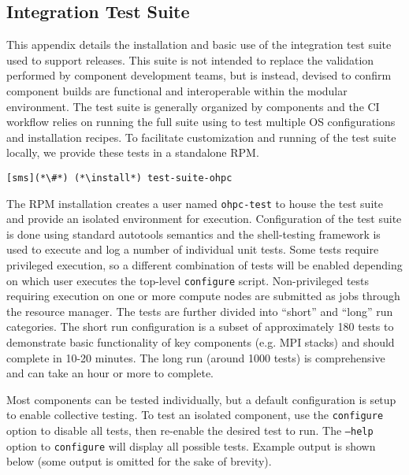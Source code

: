 \clearpage
\subsection{Integration Test Suite}  \label{appendix:test_suite}

This appendix details the installation and basic use of the integration test
suite used to support \OHPC{} releases. This suite is not intended to replace
the validation performed by component development teams, but is instead,
devised to confirm component builds are functional and interoperable within
the modular \OHPC{} environment.
The test suite is generally organized by components and the \OHPC{} CI workflow
relies on running the full suite using \href{https://jenkins.io}{\color{blue}{Jenkins}} to test
multiple OS configurations and installation recipes.
To facilitate customization and running of the test suite locally, we 
provide these tests in a standalone RPM. 

\begin{lstlisting}
[sms](*\#*) (*\install*) test-suite-ohpc
\end{lstlisting}

The RPM installation creates a user named \texttt{ohpc-test} to house the test
suite and provide an isolated environment for execution.  Configuration of the
test suite is done using standard \GNU{} autotools semantics and the
\href{https://jenkins.io}{\color{blue}{BATS}} shell-testing framework is used
to execute and log a number of individual unit tests.  Some tests require
privileged execution, so a different combination of tests will be enabled
depending on which user executes the top-level \texttt{configure}
script. Non-privileged tests requiring execution on one or more compute nodes are
submitted as jobs through the \rms{} resource manager. The tests are further
divided into ``short'' and ``long'' run categories. The short run configuration
is a subset
of approximately 180 tests to demonstrate basic functionality of key components
(e.g. MPI stacks) and should complete in 10-20 minutes. The long run (around
1000 tests) is comprehensive and can take an hour or more to complete.

Most components can be tested individually, but a default configuration is
setup to enable collective testing. To test an isolated component, use the
\texttt{configure} option to disable all tests, then re-enable the desired test
to run. The \texttt{--help} option to \texttt{configure} will display all
possible tests. Example output is shown below (some output is omitted for the
sake of brevity).


